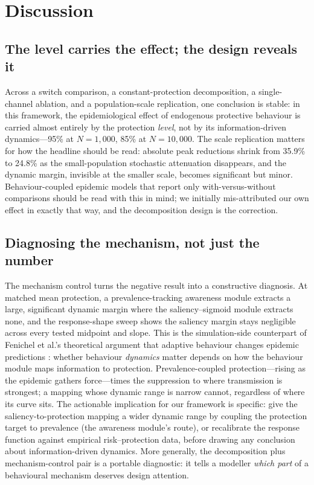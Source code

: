 \documentclass[]{interact}
\begin{document}
\section{Discussion}

\subsection{The level carries the effect; the design reveals it}

Across a switch comparison, a constant-protection decomposition, a single-channel ablation, and a population-scale replication, one conclusion is stable: in this framework, the epidemiological effect of endogenous protective behaviour is carried almost entirely by the protection \emph{level}, not by its information-driven dynamics---95\% at $N{=}1{,}000$, 85\% at $N{=}10{,}000$. The scale replication matters for how the headline should be read: absolute peak reductions shrink from 35.9\% to 24.8\% as the small-population stochastic attenuation disappears, and the dynamic margin, invisible at the smaller scale, becomes significant but minor. Behaviour-coupled epidemic models that report only with-versus-without comparisons should be read with this in mind; we initially mis-attributed our own effect in exactly that way, and the decomposition design is the correction.

\subsection{Diagnosing the mechanism, not just the number}

The mechanism control turns the negative result into a constructive diagnosis. At matched mean protection, a prevalence-tracking awareness module extracts a large, significant dynamic margin where the saliency--sigmoid module extracts none, and the response-shape sweep shows the saliency margin stays negligible across every tested midpoint and slope. This is the simulation-side counterpart of Fenichel et al.'s theoretical argument that adaptive behaviour changes epidemic predictions \cite{fenichel2011adaptive}: whether behaviour \emph{dynamics} matter depends on how the behaviour module maps information to protection. Prevalence-coupled protection---rising as the epidemic gathers force---times the suppression to where transmission is strongest; a mapping whose dynamic range is narrow cannot, regardless of where its curve sits. The actionable implication for our framework is specific: give the saliency-to-protection mapping a wider dynamic range by coupling the protection target to prevalence (the awareness module's route), or recalibrate the response function against empirical risk--protection data, before drawing any conclusion about information-driven dynamics. More generally, the decomposition plus mechanism-control pair is a portable diagnostic: it tells a modeller \emph{which part} of a behavioural mechanism deserves design attention.
\end{document}
